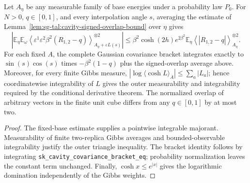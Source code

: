 \begin{lemma}
\label{lem:sg-tal:cavity-outer-signed-overlap-bound}
  \leanok
{}
Let $A_\eta$ be any measurable family of base energies under a probability law $P_0$.
For $N>0$, $q\in[0,1]$, and every interpolation angle $s$, averaging the estimate of Lemma~\ref{lem:sg-tal:cavity-signed-overlap-bound}
over $\eta$ gives
\[
 \left|\mathbb E_\eta\mathbb E_\omega\left\langle
   \varepsilon^1\varepsilon^2\beta^2(R_{1,2}-q)
 \right\rangle_{A_\eta+\varepsilon L(s)}^{\otimes 2}\right|
 \le \beta^2\cosh(2h)e^{2\beta^2}
   \mathbb E_\eta\left\langle |R_{1,2}-q|\right\rangle_{A_\eta}^{\otimes 2}.
\]
For each fixed $A$, the complete Gaussian covariance bracket integrates exactly to
$\sin(s)\cos(s)$ times $-\beta^2(1-q)$ plus the signed-overlap average above.
Moreover, for every finite Gibbs measure,
$|\log\langle\cosh L\rangle_A|\le\sum_a|L_a|$; hence coordinatewise integrability of
$L$ gives the outer measurability and integrability required by the conditional derivative
theorem.  The normalized overlap of arbitrary vectors in the finite unit cube differs from
any $q\in[0,1]$ by at most two.
\end{lemma}
\begin{proof}
  \leanok
The fixed-base estimate supplies a pointwise integrable majorant.  Measurability of finite
two-replica Gibbs averages and bounded-observable integrability justify the outer triangle
inequality.  The bracket identity follows by integrating
\texttt{sk\_cavity\_covariance\_bracket\_eq}; probability normalization leaves the constant
term unchanged.  Finally, $\cosh x\le e^{|x|}$ gives the logarithmic domination independently
of the Gibbs weights.
\end{proof}

